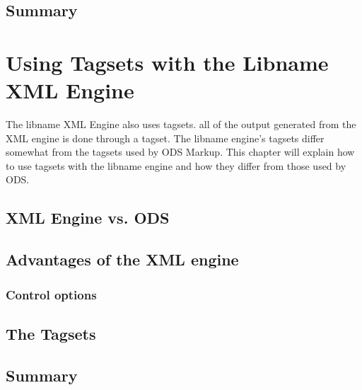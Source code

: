 \documentclass{book}
\begin{document}
\section{Summary}

\chapter{Using Tagsets with the Libname XML Engine}
The libname XML Engine also uses tagsets.  all of the output generated
from the XML engine is done through a tagset.  The libname engine's 
tagsets differ somewhat from the tagsets used by ODS Markup.  This chapter
will explain how to use tagsets with the libname engine and how they
differ from those used by ODS.
\section{XML Engine vs. ODS}

\section{Advantages of the XML engine}

\subsection{Control options}

\section{The Tagsets}

\section{Summary}

\backmatter
\end{document}
